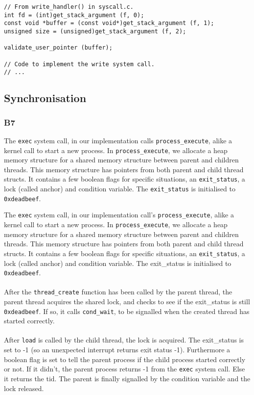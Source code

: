 \documentclass[a4wide, 11pt]{article}
\newcommand{\tx}{\texttt}
\begin{document}
\begin{verbatim}
// From write_handler() in syscall.c.
int fd = (int)get_stack_argument (f, 0);
const void *buffer = (const void*)get_stack_argument (f, 1);
unsigned size = (unsigned)get_stack_argument (f, 2);

validate_user_pointer (buffer);

// Code to implement the write system call.
// ...
\end{verbatim}

\subsection{Synchronisation}
\subsubsection{B7}

The \tx{exec} system call, in our implementation calls \tx{process\_execute}, alike a kernel call to start a new process. In \tx{process\_execute}, we allocate a heap memory structure for a shared memory structure between parent and children threads. This memory structure has pointers from both parent and child thread structs. It contains a few boolean flags for specific situations, an \tx{exit\_status}, a lock (called anchor) and condition variable. The \tx{exit\_status} is initialised to \tx{0xdeadbeef}.

The \tx{exec} system call, in our implementation call's \tx{process\_execute}, alike a kernel call to start a new process. In \tx{process\_execute}, we allocate a heap memory structure for a shared memory structure between parent and children threads. This memory structure has pointers from both parent and child thread structs. It contains a few boolean flags for specific situations, an \tx{exit\_status}, a lock (called anchor) and condition variable. The exit\_status is initialised to \tx{0xdeadbeef}.
\\\\
After the \tx{thread\_create} function has been called by the parent thread, the parent thread acquires the shared lock, and checks to see if the exit\_status is still \tx{0xdeadbeef}. If so, it calls \tx{cond\_wait}, to be signalled when the created thread has started correctly.
\\\\
After \texttt{load} is called by the child thread, the lock is acquired. The exit\_status is set to -1 (so an unexpected interrupt returns exit status -1). Furthermore a boolean flag is set to tell the parent process if the child process started correctly or not. If it didn't, the parent process returns -1 from the \texttt{exec} system call. Else it returns the tid. The parent is finally signalled by the condition variable and the lock released.
\end{document}
